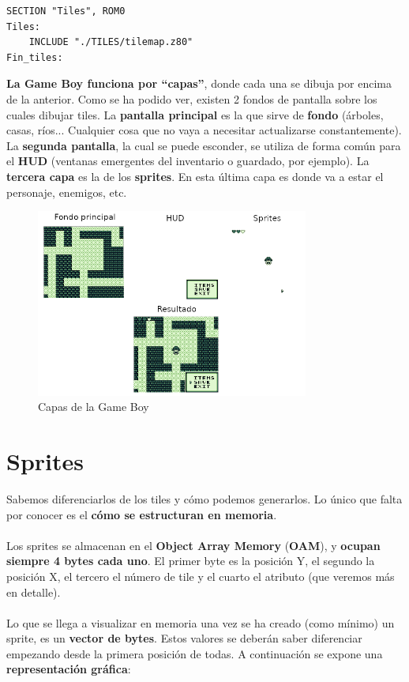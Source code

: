 \begin{lstlisting}[caption={Inclusión de un Fichero Binario}, label={code:tiles}]
SECTION "Tiles", ROM0
Tiles:
	INCLUDE "./TILES/tilemap.z80"
Fin_tiles:
\end{lstlisting}

\textbf{La Game Boy funciona por ``capas''}, donde cada una se dibuja por encima de la anterior. Como se ha podido ver, existen 2 fondos de pantalla sobre los cuales dibujar tiles. La \textbf{pantalla principal} es la que sirve de \textbf{fondo} (árboles, casas, ríos... Cualquier cosa que no vaya a necesitar actualizarse constantemente). La \textbf{segunda pantalla}, la cual se puede esconder, se utiliza de forma común para el \textbf{HUD} (ventanas emergentes del inventario o guardado, por ejemplo). La \textbf{tercera capa} es la de los \textbf{sprites}. En esta última capa es donde va a estar el personaje, enemigos, etc.

\begin{figure}[h]
\centering
\includegraphics[width=0.8\textwidth]{include/images/manual/capas.png}
\caption{Capas de la Game Boy}
\label{figure:bgb}
\end{figure}

\clearpage

\section{Sprites}
\label{manual_sprites}

Sabemos diferenciarlos de los tiles y cómo podemos generarlos. Lo único que falta por conocer es el \textbf{cómo se estructuran en memoria}.
\\ \\
Los sprites se almacenan en el \textbf{Object Array Memory} (\textbf{OAM}), y \textbf{ocupan siempre 4 bytes cada uno}. El primer byte es la posición Y, el segundo la posición X, el tercero el número de tile y el cuarto el atributo (que veremos más en detalle).
\\ \\
Lo que se llega a visualizar en memoria una vez se ha creado (como mínimo) un sprite, es un \textbf{vector de bytes}. Estos valores se deberán saber diferenciar empezando desde la primera posición de todas. A continuación se expone una \textbf{representación gráfica}:

